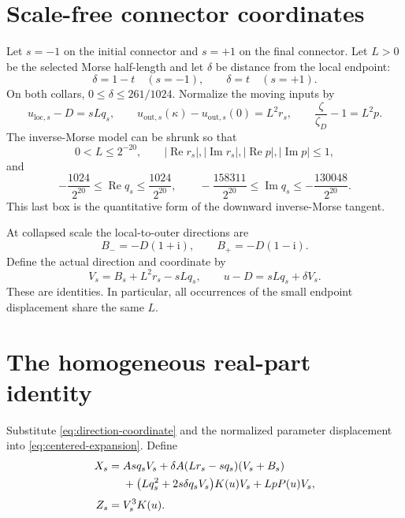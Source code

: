 \documentclass[11pt]{article}
\newcommand{\re}{\operatorname{Re}}
\newcommand{\impart}{\operatorname{Im}}
\newcommand{\ii}{\mathrm i}
\begin{document}
\section{Scale-free connector coordinates}\label{sec:boxes}

Let \(s=-1\) on the initial connector and \(s=+1\) on the final connector. Let \(L>0\)
be the selected Morse half-length and let \(\delta\) be distance from the local endpoint:
\[
 \delta=1-t\quad(s=-1),\qquad \delta=t\quad(s=+1).
\]
On both collars, \(0\leq\delta\leq261/1024\). Normalize the moving inputs by
\[
 u_{\mathrm{loc},s}-D=sLq_s,\qquad
 u_{\mathrm{out},s}(\kappa)-u_{\mathrm{out},s}(0)=L^2r_s,\qquad
 \frac{\zeta}{\zeta_D}-1=L^2p.
\]
The inverse-Morse model can be shrunk so that
\begin{equation}\label{eq:primitive-bounds}
 0<L\leq2^{-20},\qquad
 |\re r_s|,|\impart r_s|,|\re p|,|\impart p|\leq1,
\end{equation}
and
\begin{equation}\label{eq:q-box}
 -\frac{1024}{2^{20}}\leq\re q_s\leq\frac{1024}{2^{20}},
 \qquad
 -\frac{158311}{2^{20}}\leq\impart q_s\leq-\frac{130048}{2^{20}}.
\end{equation}
This last box is the quantitative form of the downward inverse-Morse tangent.

At collapsed scale the local-to-outer directions are
\[
 B_-=-D(1+\ii),\qquad B_+=-D(1-\ii).
\]
Define the actual direction and coordinate by
\begin{equation}\label{eq:direction-coordinate}
 V_s=B_s+L^2r_s-sLq_s,\qquad
 u-D=sLq_s+\delta V_s.
\end{equation}
These are identities. In particular, all occurrences of the small endpoint displacement
share the same \(L\).

\section{The homogeneous real-part identity}

Substitute \eqref{eq:direction-coordinate} and the normalized parameter displacement into
\eqref{eq:centered-expansion}. Define
\begin{align}
 X_s={}&Asq_sV_s
 +\delta A(Lr_s-sq_s)(V_s+B_s) \notag\\
 &+\bigl(Lq_s^2+2s\delta q_sV_s\bigr)K(u)V_s
 +LpP(u)V_s,\label{eq:X}\\[3pt]
 Z_s={}&V_s^3K(u).\label{eq:Z}
\end{align}
\end{document}
